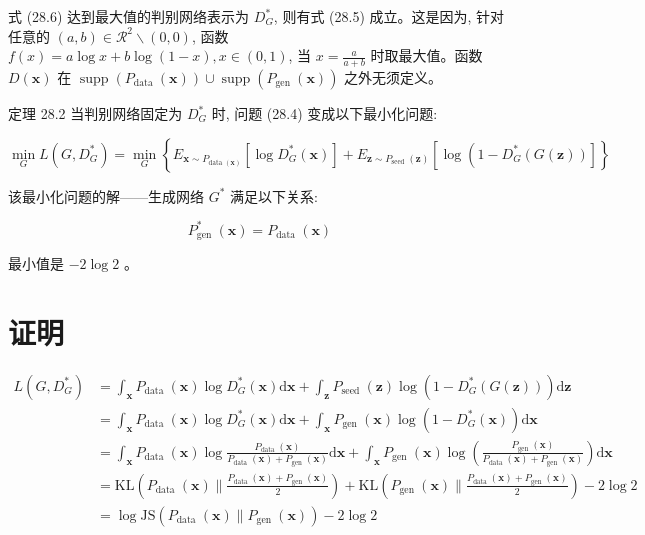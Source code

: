 \documentclass[10pt]{article}
\begin{document}
式 (28.6) 达到最大值的判别网络表示为 $D_{G}^{*}$, 则有式 (28.5) 成立。这是因为, 针对任意的 $(a, b) \in \mathcal{R}^{2} \backslash(0,0)$, 函数 $f(x)=a \log x+b \log (1-x), x \in(0,1)$, 当 $x=\frac{a}{a+b}$ 时取最大值。函数 $D(\boldsymbol{x})$ 在 $\operatorname{supp}\left(P_{\text {data }}(\boldsymbol{x})\right) \cup \operatorname{supp}\left(P_{\text {gen }}(\boldsymbol{x})\right)$ 之外无须定义。

定理 28.2 当判别网络固定为 $D_{G}^{*}$ 时, 问题 (28.4) 变成以下最小化问题:

$$
\min _{G} L\left(G, D_{G}^{*}\right)=\min _{G}\left\{E_{\boldsymbol{x} \sim P_{\text {data }(\boldsymbol{x})}}\left[\log D_{G}^{*}(\boldsymbol{x})\right]+E_{\boldsymbol{z} \sim P_{\text {seed }}(\boldsymbol{z})}\left[\log \left(1-D_{G}^{*}(G(\boldsymbol{z}))\right]\right\}\right.
$$

该最小化问题的解——生成网络 $G^{*}$ 满足以下关系:


\begin{equation*}
P_{\text {gen }}^{*}(\boldsymbol{x})=P_{\text {data }}(\boldsymbol{x}) \tag{28.7}
\end{equation*}


最小值是 $-2 \log 2$ 。

\section*{证明}

\begin{align*}
L\left(G, D_{G}^{*}\right) & =\int_{\boldsymbol{x}} P_{\text {data }}(\boldsymbol{x}) \log D_{G}^{*}(\boldsymbol{x}) \mathrm{d} \boldsymbol{x}+\int_{\boldsymbol{z}} P_{\text {seed }}(\boldsymbol{z}) \log \left(1-D_{G}^{*}(G(\boldsymbol{z}))\right) \mathrm{d} \boldsymbol{z} \\
& =\int_{\boldsymbol{x}} P_{\text {data }}(\boldsymbol{x}) \log D_{G}^{*}(\boldsymbol{x}) \mathrm{d} \boldsymbol{x}+\int_{\boldsymbol{x}} P_{\text {gen }}(\boldsymbol{x}) \log \left(1-D_{G}^{*}(\boldsymbol{x})\right) \mathrm{d} \boldsymbol{x} \\
& =\int_{\boldsymbol{x}} P_{\text {data }}(\boldsymbol{x}) \log \frac{P_{\text {data }}(\boldsymbol{x})}{P_{\text {data }}(\boldsymbol{x})+P_{\text {gen }}(\boldsymbol{x})} \mathrm{d} \boldsymbol{x}+\int_{\boldsymbol{x}} P_{\text {gen }}(\boldsymbol{x}) \log \left(\frac{P_{\text {gen }}(\boldsymbol{x})}{P_{\text {data }}(\boldsymbol{x})+P_{\text {gen }}(\boldsymbol{x})}\right) \mathrm{d} \boldsymbol{x} \\
& =\mathrm{KL}\left(P_{\text {data }}(\boldsymbol{x}) \| \frac{P_{\text {data }}(\boldsymbol{x})+P_{\text {gen }}(\boldsymbol{x})}{2}\right)+\mathrm{KL}\left(P_{\text {gen }}(\boldsymbol{x}) \| \frac{P_{\text {data }}(\boldsymbol{x})+P_{\text {gen }}(\boldsymbol{x})}{2}\right)-2 \log 2 \\
& =\log \mathrm{JS}\left(P_{\text {data }}(\boldsymbol{x}) \| P_{\text {gen }}(\boldsymbol{x})\right)-2 \log 2 \tag{28.8}
\end{align*}
\end{document}
